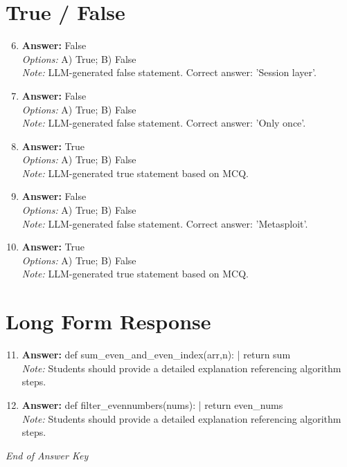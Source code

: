 \documentclass[12pt]{article}
\begin{document}
\section*{True / False}
\begin{enumerate}[label=\arabic*.]
\setcounter{enumi}{5}
\item \textbf{Answer:} False
\\ \textit{Options:} A) True; B) False
\\ \textit{Note:} LLM-generated false statement. Correct answer: 'Session layer'.
\item \textbf{Answer:} False
\\ \textit{Options:} A) True; B) False
\\ \textit{Note:} LLM-generated false statement. Correct answer: 'Only once'.
\item \textbf{Answer:} True
\\ \textit{Options:} A) True; B) False
\\ \textit{Note:} LLM-generated true statement based on MCQ.
\item \textbf{Answer:} False
\\ \textit{Options:} A) True; B) False
\\ \textit{Note:} LLM-generated false statement. Correct answer: 'Metasploit'.
\item \textbf{Answer:} True
\\ \textit{Options:} A) True; B) False
\\ \textit{Note:} LLM-generated true statement based on MCQ.
\end{enumerate}

\section*{Long Form Response}
\begin{enumerate}[label=\arabic*.]
\setcounter{enumi}{10}
\item \textbf{Answer:} def sum\_even\_and\_even\_index(arr,n): | return sum
\\ \textit{Note:} Students should provide a detailed explanation referencing algorithm steps.
\item \textbf{Answer:} def filter\_evennumbers(nums): | return even\_nums
\\ \textit{Note:} Students should provide a detailed explanation referencing algorithm steps.
\end{enumerate}

\vfill
\noindent\textit{End of Answer Key}
\end{document}
